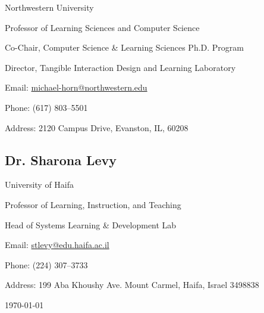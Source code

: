 \documentclass[11pt,letterpaper]{report} %
\newcommand{\listitemspace}{0.25em}
\renewenvironment{itemize}
{\begin{list}{}{\setlength{\leftmargin}{0em}
                \setlength{\parskip}{0em}
                \setlength{\itemsep}{\listitemspace}
                \setlength{\parsep}{\listitemspace}}}
{\end{list}}
\begin{document}
    \begin{itemize}

        \item Northwestern University
        \item Professor of Learning Sciences and Computer Science
        \item Co-Chair,  Computer Science \& Learning Sciences Ph.D. Program
        \item Director, Tangible Interaction Design and Learning Laboratory
        \item Email: \href{mailto: michael-horn@northwestern.edu}{michael-horn@northwestern.edu}
        \item Phone: (617) 803--5501
        \item Address: 2120 Campus Drive, Evanston, IL, 60208

    \end{itemize}


    \subsection*{Dr. Sharona Levy}

    \begin{itemize}
        \item University of Haifa
        \item Professor of Learning, Instruction, and Teaching
        \item Head of Systems Learning \& Development Lab
        \item Email: \href{mailto: stlevy@edu.haifa.ac.il}{stlevy@edu.haifa.ac.il}
        \item Phone: (224) 307--3733
        \item Address: 199 Aba Khoushy Ave. Mount Carmel, Haifa, Israel 3498838
    \end{itemize}


    \begin{center}
        \vfill
        \monthyeardate\today
    \end{center}
\end{document}

